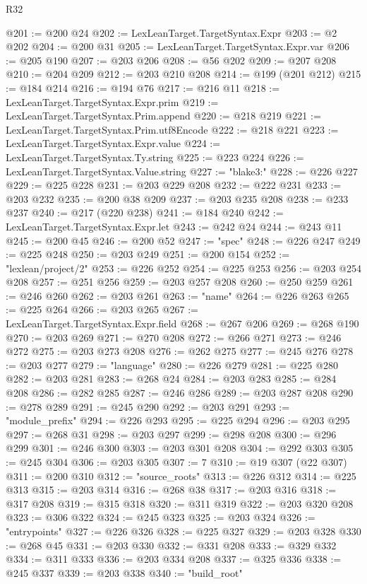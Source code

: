 \begin{lexlean}{R32}
\begin{coremodule}
@201 := @200 @24
@202 := LexLeanTarget.TargetSyntax.Expr
@203 := @2 @202
@204 := @200 @31
@205 := LexLeanTarget.TargetSyntax.Expr.var
@206 := @205 @190
@207 := @203 @206
@208 := @56 @202
@209 := @207 @208
@210 := @204 @209
@212 := @203 @210 @208
@214 := @199 (@201 @212)
@215 := @184 @214
@216 := @194 @76
@217 := @216 @11
@218 := LexLeanTarget.TargetSyntax.Expr.prim
@219 := LexLeanTarget.TargetSyntax.Prim.append
@220 := @218 @219
@221 := LexLeanTarget.TargetSyntax.Prim.utf8Encode
@222 := @218 @221
@223 := LexLeanTarget.TargetSyntax.Expr.value
@224 := LexLeanTarget.TargetSyntax.Ty.string
@225 := @223 @224
@226 := LexLeanTarget.TargetSyntax.Value.string
@227 := "blake3:"
@228 := @226 @227
@229 := @225 @228
@231 := @203 @229 @208
@232 := @222 @231
@233 := @203 @232
@235 := @200 @38 @209
@237 := @203 @235 @208
@238 := @233 @237
@240 := @217 (@220 @238)
@241 := @184 @240
@242 := LexLeanTarget.TargetSyntax.Expr.let
@243 := @242 @24
@244 := @243 @11
@245 := @200 @45
@246 := @200 @52
@247 := "spec"
@248 := @226 @247
@249 := @225 @248
@250 := @203 @249
@251 := @200 @154
@252 := "lexlean/project/2"
@253 := @226 @252
@254 := @225 @253
@256 := @203 @254 @208
@257 := @251 @256
@259 := @203 @257 @208
@260 := @250 @259
@261 := @246 @260
@262 := @203 @261
@263 := "name"
@264 := @226 @263
@265 := @225 @264
@266 := @203 @265
@267 := LexLeanTarget.TargetSyntax.Expr.field
@268 := @267 @206
@269 := @268 @190
@270 := @203 @269
@271 := @270 @208
@272 := @266 @271
@273 := @246 @272
@275 := @203 @273 @208
@276 := @262 @275
@277 := @245 @276
@278 := @203 @277
@279 := "language"
@280 := @226 @279
@281 := @225 @280
@282 := @203 @281
@283 := @268 @24
@284 := @203 @283
@285 := @284 @208
@286 := @282 @285
@287 := @246 @286
@289 := @203 @287 @208
@290 := @278 @289
@291 := @245 @290
@292 := @203 @291
@293 := "module_prefix"
@294 := @226 @293
@295 := @225 @294
@296 := @203 @295
@297 := @268 @31
@298 := @203 @297
@299 := @298 @208
@300 := @296 @299
@301 := @246 @300
@303 := @203 @301 @208
@304 := @292 @303
@305 := @245 @304
@306 := @203 @305
@307 := 7
@310 := @19 @307 (@22 @307)
@311 := @200 @310
@312 := "source_roots"
@313 := @226 @312
@314 := @225 @313
@315 := @203 @314
@316 := @268 @38
@317 := @203 @316
@318 := @317 @208
@319 := @315 @318
@320 := @311 @319
@322 := @203 @320 @208
@323 := @306 @322
@324 := @245 @323
@325 := @203 @324
@326 := "entrypoints"
@327 := @226 @326
@328 := @225 @327
@329 := @203 @328
@330 := @268 @45
@331 := @203 @330
@332 := @331 @208
@333 := @329 @332
@334 := @311 @333
@336 := @203 @334 @208
@337 := @325 @336
@338 := @245 @337
@339 := @203 @338
@340 := "build_root"

\end{coremodule}
\end{lexlean}
